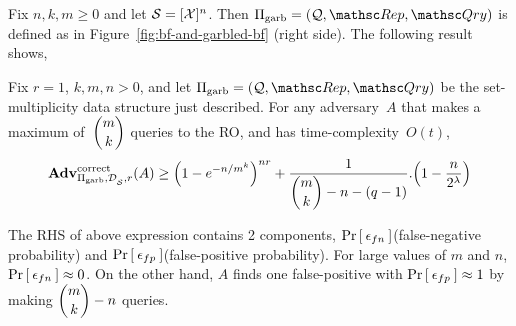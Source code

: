 Fix $n,k,m \geq 0$ and let $\mathcal{S}=[{\cal X}]^n$.  Then $\Pi_{\mathrm{garb}}= (\calQ,\Rep, \Qry)$ is defined as in Figure~\ref{fig:bf-and-garbled-bf} (right side).  The following result shows,

\begin{theorem}\label{thm:gbf-correctness}
Fix $r=1$, $k,m,n>0$, and let $\Pi_{\mathrm{garb}}= (\calQ,\Rep, \Qry)$ be the set-multiplicity data structure just described. For any adversary~$A$ that makes a maximum of~$\dbinom{m}{k}$ queries to the RO, and has time-complexity~$O(t)$,
\[
\mathrm{\mathbf{Adv}}^{\mathrm{correct}}_{\Pi_{\mathrm{garb}},\mathcal{D}_{{\cal S}}^{},r}(A)  \geq   \left(1 - e^{-n/m^k}\right)^{nr} + \dfrac{1}{\dbinom{m}{k}-n-(q-1)} . \Big(1-\dfrac{n}{2^\lambda}\Big)
\]

The RHS of above expression contains 2 components, $\Pr\left[\: \epsilon_{fn} \:\right]$(false-negative probability) and $\Pr\left[\: \epsilon_{fp} \:\right]$(false-positive probability). For large values of $m$ and $n$, $\Pr\left[\: \epsilon_{fn} \:\right] \approx 0$. On the other hand, $A$ finds one false-positive with $\Pr\left[\: \epsilon_{fp} \:\right] \approx 1$ by making $\dbinom{m}{k} - n$ queries.

\end{theorem}

